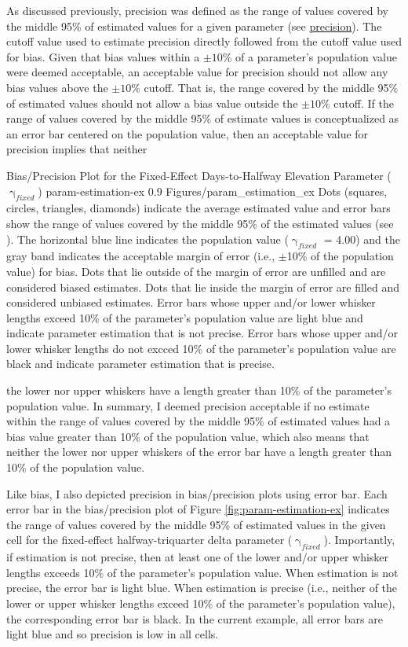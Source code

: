 \documentclass[
12pt, %
twoside,
english]{guelphthesis}
\begin{document}
As discussed previously, precision was defined as the range of values covered by the middle 95\% of estimated values for a given parameter (see \protect\hyperlink{precision-slow-exp3}{precision}). The cutoff value used to estimate precision directly followed from the cutoff value used for bias. Given that bias values within a \(\pm10\%\) of a parameter's population value were deemed acceptable, an acceptable value for precision should not allow any bias values above the \(\pm10\%\) cutoff. That is, the range covered by the middle 95\% of estimated values should not allow a bias value outside the \(\pm10\%\) cutoff. If the range of values covered by the middle 95\% of estimate values is conceptualized as an error bar centered on the population value, then an acceptable value for precision implies that neither
\begin{apaFigure}
[portrait]
[0cm]
{Bias/Precision Plot for the Fixed-Effect Days-to-Halfway Elevation Parameter ($\upgamma_{fixed}$)}
{param-estimation-ex}
{0.9}
{Figures/param_estimation_ex}
{Dots (squares, circles, triangles, diamonds) indicate the average estimated value and error bars show the range of values covered by the middle 95\% of the estimated values (see ).  The horizontal blue line indicates the population value ($\upgamma_{fixed}$ = 4.00) and the gray band indicates the acceptable margin of error (i.e., $\pm$10\% of the population value) for bias. Dots that lie outside of the margin of error are unfilled and are considered biased estimates. Dots that lie inside the margin of error are filled and considered unbiased estimates. Error bars whose upper and/or lower whisker lengths exceed 10\% of the parameter's population value are light blue and indicate parameter estimation that is not precise. Error bars whose upper and/or lower whisker lengths do not excced 10\% of the parameter's population value are black and indicate parameter estimation that is precise.}
\end{apaFigure}
\noindent the lower nor upper whiskers have a length greater than 10\% of the parameter's population value. In summary, I deemed precision acceptable if no estimate within the range of values covered by the middle 95\% of estimated values had a bias value greater than 10\% of the population value, which also means that neither the lower nor upper whiskers of the error bar have a length greater than 10\% of the population value.

Like bias, I also depicted precision in bias/precision plots using error bar. Each error bar in the bias/precision plot of Figure \ref{fig:param-estimation-ex} indicates the range of values covered by the middle 95\% of estimated values in the given cell for the fixed-effect halfway-triquarter delta parameter (\(\upgamma_{fixed}\)). Importantly, if estimation is not precise, then at least one of the lower and/or upper whisker lengths exceeds 10\% of the parameter's population value. When estimation is not precise, the error bar is light blue. When estimation is precise (i.e., neither of the lower or upper whisker lengths exceed 10\% of the parameter's population value), the corresponding error bar is black. In the current example, all error bars are light blue and so precision is low in all cells.
\end{document}
